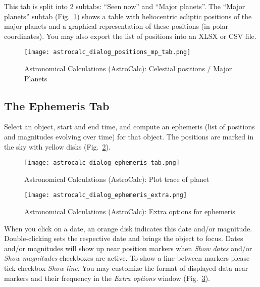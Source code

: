 This tab  is split into 2 subtabs: ``Seen now'' and ``Major planets''.
The ``Major planets'' subtab (Fig.~\ref{fig:gui:AstroCalc:Positions:MajorPlanets}) shows a table
with heliocentric ecliptic positions of the major planets and a graphical representation of these positions
(in polar coordinates). You may also export the list of positions into an XLSX or CSV file.

\begin{figure}[htbp]
	\centering\texttt{[image: astrocalc\_dialog\_positions\_mp\_tab.png]}
	\caption{Astronomical Calculations (AstroCalc): Celestial positions / Major Planets}
	\label{fig:gui:AstroCalc:Positions:MajorPlanets}
\end{figure}

\subsection{The Ephemeris Tab}
\label{sec:gui:AstroCalc:Ephemeris}

Select an object, start and end time, and compute an ephemeris (list of positions and magnitudes evolving over time) for that object. 
The positions are marked in the sky with yellow disks (Fig.~\ref{fig:gui:AstroCalc:Ephemeris}). 

\begin{figure}[tbp]
	\centering\texttt{[image: astrocalc\_dialog\_ephemeris\_tab.png]}
	\caption{Astronomical Calculations (AstroCalc): Plot trace of planet}
	\label{fig:gui:AstroCalc:Ephemeris}
\end{figure}

\begin{figure}[tbp]
	\centering\texttt{[image: astrocalc\_dialog\_ephemeris\_extra.png]}
	\caption{Astronomical Calculations (AstroCalc): Extra options for ephemeris}
	\label{fig:gui:AstroCalc:Ephemeris:Extra}
\end{figure}

When you click on a date, an orange disk indicates this date and/or magnitude. 
Double-clicking sets the respective date and brings the object to focus. 
Dates and/or magnitudes will show up near position markers when \emph{Show dates} 
and/or \emph{Show magnitudes} checkboxes are active.  
To show a line between markers please tick checkbox \emph{Show line}. 
You may customize the format of displayed data near markers and their frequency in the \emph{Extra options} window (Fig.~\ref{fig:gui:AstroCalc:Ephemeris:Extra}).

